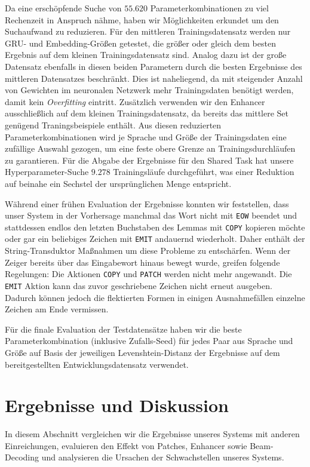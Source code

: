 \documentclass[11pt,a4paper]{article}
\newcommand{\action}[1]{\texttt{#1}}
\begin{document}
Da eine erschöpfende Suche von $55.620$ Parameterkombinationen zu viel Rechenzeit in Anspruch nähme, haben wir Möglichkeiten erkundet um den Suchaufwand zu reduzieren. Für den mittleren Trainingsdatensatz werden nur GRU- und Embedding-Größen getestet, die größer oder gleich dem besten Ergebnis auf dem kleinen Trainingsdatensatz sind.
Analog dazu ist der große Datensatz ebenfalls in diesen beiden Parametern durch die besten Ergebnisse des mittleren Datensatzes beschränkt.
Dies ist naheliegend, da mit steigender Anzahl von Gewichten im neuronalen Netzwerk mehr Trainingsdaten benötigt werden, damit kein \textit{Overfitting} eintritt.
Zusätzlich verwenden wir den Enhancer ausschließlich auf dem kleinen Trainingsdatensatz, da bereits das mittlere Set genügend Traningsbeispiele enthält.
Aus diesen reduzierten Parameterkombinationen wird je Sprache und Größe der Trainingsdaten eine zufällige Auswahl gezogen, um eine feste obere Grenze an Trainingsdurchläufen zu garantieren.
Für die Abgabe der Ergebnisse für den Shared Task hat unsere Hyperparameter-Suche $9.278$ Trainingsläufe durchgeführt, was einer Reduktion auf beinahe ein Sechstel der ursprünglichen Menge entspricht.

Während einer frühen Evaluation der Ergebnisse konnten wir feststellen, dass unser System in der Vorhersage manchmal das Wort nicht mit \action{EOW} beendet und stattdessen endlos den letzten Buchstaben des Lemmas mit \action{COPY} kopieren möchte oder gar ein beliebiges Zeichen mit \action{EMIT} andauernd wiederholt.
Daher enthält der String-Transduktor Maßnahmen um diese Probleme zu entschärfen.
Wenn der Zeiger bereits über das Eingabewort hinaus bewegt wurde, greifen folgende Regelungen:
Die Aktionen \action{COPY} und \action{PATCH} werden nicht mehr angewandt. Die \action{EMIT} Aktion kann das zuvor geschriebene Zeichen nicht erneut ausgeben. 
Dadurch können jedoch die flektierten Formen in einigen Ausnahmefällen einzelne Zeichen am Ende vermissen. 

Für die finale Evaluation der Testdatensätze haben wir die beste Parameterkombination (inklusive Zufalls-Seed) für jedes Paar aus Sprache und Größe auf Basis der jeweiligen Levenshtein-Distanz der Ergebnisse auf dem bereitgestellten Entwicklungsdatensatz verwendet.

\section{Ergebnisse und Diskussion}
\label{sec:results}

In diesem Abschnitt vergleichen wir die Ergebnisse unseres Systems mit anderen Einreichungen, evaluieren den Effekt von Patches, Enhancer sowie Beam-Decoding und analysieren die Ursachen der Schwachstellen unseres Systems.
\end{document}
